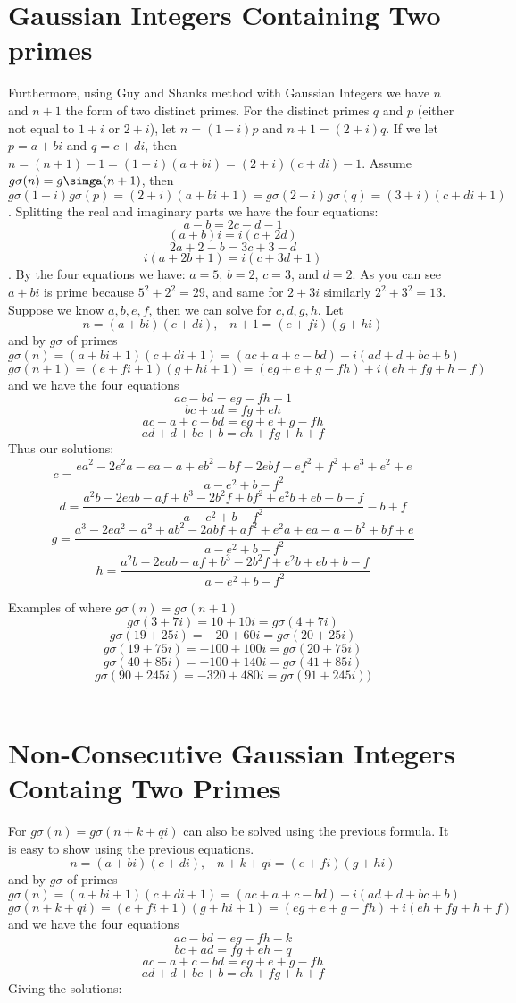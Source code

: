 \documentclass[12pt]{amsart}
\begin{document}
\section{Gaussian Integers Containing Two primes}
Furthermore, using Guy and Shanks method with Gaussian Integers we have $n$ and $n+1$ the form of two distinct primes. For the distinct primes $q$ and $p$ (either not equal to $1+i$ or $2+i$), let $n = (1+i)p$ and $n+1 = (2+i)q$. If we let $p = a+bi$ and $q=c+di$, then $n = (n + 1) - 1 = (1+i)(a+bi) = (2+i)(c+di) - 1$.  Assume $g\sigma(n) = g\simga(n+1)$, then $g\sigma(1+i)g\sigma(p) = (2+i)(a + bi + 1) = g\sigma(2+i)g\sigma(q) = (3+i)(c+di+1)$. Splitting the real and imaginary parts we have the four equations: $$ a -b = 2c - d - 1$$ $$(a + b)i = i(c + 2d)$$ $$2a + 2 -b = 3c + 3 - d$$ $$i(a +2b + 1) = i(c + 3d + 1)$$. By the four equations we have: $a = 5$, $b=2$, $c = 3$, and $d = 2$. As you can see $a+bi$ is prime because $5^2 + 2^2 = 29$, and same for $2+3i$ similarly $2^2 + 3^2 = 13$.
\\

Suppose we know $a,b,e,f$, then we can solve for $c,d,g,h$.
Let $$n = (a + bi)(c+di), \; \; \; n+1 = (e + fi)(g + hi)$$ and by $g\sigma$ of primes  $$ g\sigma(n) = (a + bi + 1)(c + di + 1) = (ac + a + c -bd) + i(ad + d + bc + b)$$ $$ g\sigma(n+1) = (e + fi + 1)(g + hi + 1) = (eg + e + g - fh) + i(eh + fg + h + f)$$ and we have the four equations $$ac -bd = eg -fh - 1$$ $$bc + ad = fg + eh$$ $$ac + a + c -bd = eg + e + g - fh$$ $$ad + d + bc + b = eh + fg + h + f$$
Thus our solutions: 
$$c = \frac{ea^2 - 2e^2a -ea -a + eb^2 -bf -2ebf + ef^2 + f^2 + e^3 + e^2 + e} {a-e^2+b-f^2}$$ 
$$d = \frac{a^2b - 2eab -af +b^3 -2b^2f + bf^2 + e^2b + eb + b - f}{a-e^2 + b -f^2} -b + f$$ 
$$g = \frac{a^3 -2ea^2 - a^2 + ab^2 - 2abf + af^2 + e^2a + ea - a -b^2 + bf + e} {a-e^2+b-f^2}$$ 
$$h = \frac{a^2b - 2eab -af + b^3 - 2b^2f + e^2b + eb +b -f} {a-e^2+b-f^2}$$


Examples of where $g\sigma(n) = g\sigma(n+1)$
\\
$$g\sigma(3 + 7i) = 10 + 10i = g\sigma(4 + 7i)$$
$$g\sigma(19 + 25i) = -20 + 60i = g\sigma(20 + 25i)$$
$$g\sigma(19 + 75i) = -100 + 100i = g\sigma(20 + 75i)$$
$$g\sigma(40 + 85i) = -100 + 140i  = g\sigma(41 + 85i)$$
$$g\sigma(90 + 245i) = -320 + 480i  = g\sigma(91 + 245i))$$
\\

\section{Non-Consecutive Gaussian Integers Containg Two Primes}
For $g\sigma(n) = g\sigma(n+k+qi)$ can also be solved using the previous formula. It is easy to show using the previous equations. 
$$n = (a + bi)(c+di), \; \; \; n+k+qi = (e + fi)(g + hi)$$ and by $g\sigma$ of primes $$ g\sigma(n) = (a + bi + 1)(c + di + 1) = (ac + a + c -bd) + i(ad + d + bc + b)$$ $$ g\sigma(n+k+qi) = (e + fi + 1)(g + hi + 1) = (eg + e + g - fh) + i(eh + fg + h + f)$$ and we have the four equations $$ac -bd = eg -fh - k$$ $$bc + ad = fg + eh - q$$ $$ac + a + c -bd = eg + e + g - fh$$ $$ad + d + bc + b = eh + fg + h + f$$
Giving the solutions:
\end{document}
